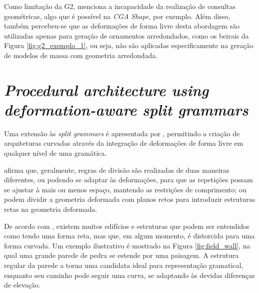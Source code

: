 \begin{figure}[h!]
	\centering
	\captionsetup{width=15cm}
	{}	
\end{figure}

Como limitação da \gls{G2},  menciona a incapacidade da realização de consultas geométricas, algo que é possível na \textit{CGA Shape}, por exemplo. Além disso, também percebeu-se que as deformações de forma livre desta abordagem são utilizadas apenas para geração de ornamentos arredondados, como os beirais da Figura \ref{fig:g2_exemplo_1}, ou seja, não são aplicadas especificamente na geração de modelos de massa com geometria arredondada.

\newpage

\section{\textit{Procedural architecture using deformation-aware split grammars}} %
\label{sec:paper_zmugg2014_sec1}

Uma extensão às \textit{split grammars} é apresentada por , permitindo a criação de arquiteturas curvadas através da integração de deformações de forma livre em qualquer nível de uma gramática. 

 afirma que, geralmente, regras de divisão são realizadas de duas maneiras diferentes, ou podendo se adaptar às deformações, para que as repetições possam se ajustar à mais ou menos espaço, mantendo as restrições de comprimento; ou podem dividir a geometria deformada com planos retos para introduzir estruturas retas na geometria deformada.

De acordo com , existem muitos edifícios e estruturas que podem ser entendidos como tendo uma forma reta, mas que, em algum momento, é distorcida para uma forma curvada. Um exemplo ilustrativo é mostrado na Figura \ref{fig:field_wall}, na qual uma grande parede de pedra se estende por uma paisagem. A estrutura regular da parede a torna uma candidata ideal para representação gramatical, enquanto seu caminho pode seguir uma curva, se adaptando às devidas diferenças de elevação.

